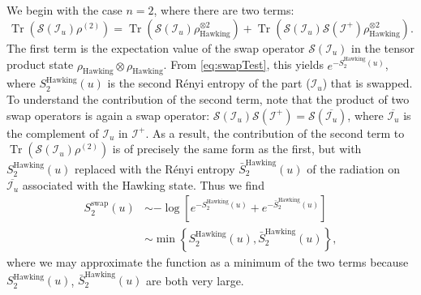 \documentclass[letterpaper,12pt]{article}
\DeclareMathOperator{\Tr}{Tr}
\newcommand*{\scri}{\mathscr{I}} %
\newcommand*{\swap}{\mathcal{S}} %
\begin{document}
We begin with the case $n=2$, where there are two terms:
\begin{equation}\label{eq:PSswapu}
	\Tr \left( \swap(\scri_u) \rho^{(2)} \right) = \Tr\left(  \swap(\scri_u) \rho_\text{Hawking}^{\otimes 2}\right)   +\Tr\left(  \swap(\scri_u) \swap(\scri^+) \rho_\text{Hawking}^{\otimes 2}\right).
\end{equation}
%
The first term is the expectation value of the swap operator $\swap(\scri_u)$ in the tensor product state $\rho_\text{Hawking} \otimes \rho_\text{Hawking}$. From \eqref{eq:swapTest}, this yields $e^{-S^{\text{Hawking}}_2(u)}$, where $S^\text{Hawking}_2(u)$ is the second R\'enyi entropy of the part ($\scri_u$) that is swapped. To understand the contribution of the second term, note that the product of two swap operators is again a swap operator: $\swap(\scri_u) \swap(\scri^+) = \swap(\overline{\scri_u})$, where $\overline{\scri_u}$ is the complement of $\scri_u$ in $\scri^+$.  As a result, the contribution of the second term to $\Tr \left( \swap(\scri_u) \rho^{(2)} \right)$ is of precisely the same form as the first, but with
$S^\text{Hawking}_2(u)$ replaced with the R\'enyi entropy $\bar S_2^\text{Hawking}(u)$ of the radiation on $\overline{\scri_u}$ associated with the Hawking state.  Thus we find
\begin{equation}
\begin{aligned}
	S^\text{swap}_2(u) &\sim -\log \left[ e^{-S_2^\text{Hawking}(u)} + e^{-\bar{S}_2^\text{Hawking}(u)}  \right] \\
	&\sim \min \left\{ S_2^\text{Hawking}(u),\bar{S}_2^\text{Hawking}(u) \right\},\label{eq:PSswapent}
\end{aligned}
\end{equation}
where we may approximate the function as a minimum of the two terms because $S_2^\text{Hawking}(u)$, $\bar{S}_2^\text{Hawking}(u)$ are both very large.
\end{document}

